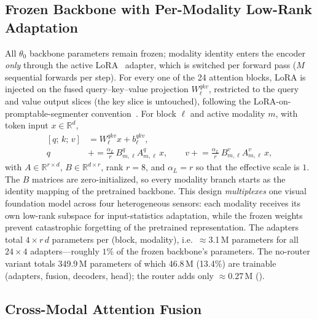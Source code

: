\subsection{Frozen Backbone with Per-Modality Low-Rank Adaptation}
\label{sec:method:lora}

All $\theta_0$ backbone parameters remain frozen; modality identity enters the
encoder \emph{only} through the active LoRA~\cite{lora2022} adapter, which is
switched per forward pass ($M$ sequential forwards per step). For every one of
the 24 attention blocks, LoRA is injected on the fused query--key--value
projection $W^{qkv}_{\ell}$, restricted to the query and value output slices
(the key slice is untouched), following the LoRA-on-promptable-segmenter
convention~\cite{samed2023}. For block $\ell$ and active modality $m$, with
token input $x\in\mathbb{R}^{d}$,
\begin{equation}
\begin{aligned}
{}[q;\,k;\,v] &= W^{qkv}_{\ell}x + b^{qkv}_{\ell},\\
q &\mathrel{+}= \tfrac{\alpha_L}{r}\, B^{q}_{m,\ell} A^{q}_{m,\ell}\, x,
\qquad
v \mathrel{+}= \tfrac{\alpha_L}{r}\, B^{v}_{m,\ell} A^{v}_{m,\ell}\, x,
\end{aligned}
\label{eq:lora}
\end{equation}
with $A\in\mathbb{R}^{r\times d}$, $B\in\mathbb{R}^{d\times r}$, rank $r=8$,
and $\alpha_L=r$ so that the effective scale is $1$. The $B$ matrices are
zero-initialized, so every modality branch starts as the identity mapping of
the pretrained backbone. This design \emph{multiplexes} one visual foundation
model across four heterogeneous sensors: each modality receives its own
low-rank subspace for input-statistics adaptation, while the frozen weights
prevent catastrophic forgetting of the pretrained representation. The
adapters total $4\times r\,d$ parameters per (block, modality), i.e.\
$\approx$3.1\,M parameters for all $24\times 4$ adapters---roughly $1\%$ of
the frozen backbone's parameters. The no-router variant totals 349.9\,M
parameters of which 46.8\,M (13.4\%) are trainable (adapters, fusion,
decoders, head); the router adds only $\approx$0.27\,M
().

\subsection{Cross-Modal Attention Fusion}
\label{sec:method:fusion}

